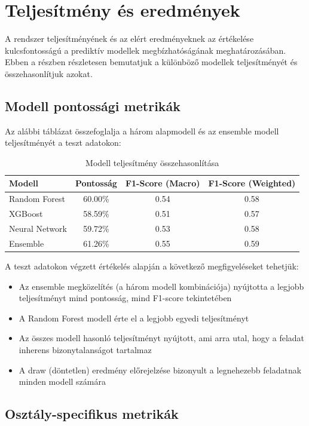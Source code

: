 \section{Teljesítmény és eredmények}

A rendszer teljesítményének és az elért eredményeknek az értékelése kulcsfontosságú a prediktív modellek megbízhatóságának meghatározásában. Ebben a részben részletesen bemutatjuk a különböző modellek teljesítményét és összehasonlítjuk azokat.

\subsection{Modell pontossági metrikák}

Az alábbi táblázat összefoglalja a három alapmodell és az ensemble modell teljesítményét a teszt adatokon:

\begin{table}[h]
\centering
\begin{tabular}{|l|c|c|c|}
\hline
\textbf{Modell} & \textbf{Pontosság} & \textbf{F1-Score (Macro)} & \textbf{F1-Score (Weighted)} \\
\hline
Random Forest & 60.00\% & 0.54 & 0.58 \\
XGBoost & 58.59\% & 0.51 & 0.57 \\
Neural Network & 59.72\% & 0.53 & 0.58 \\
Ensemble & 61.26\% & 0.55 & 0.59 \\
\hline
\end{tabular}
\caption{Modell teljesítmény összehasonlítása}
\label{tab:model-performance}
\end{table}

A teszt adatokon végzett értékelés alapján a következő megfigyeléseket tehetjük:
\begin{itemize}
    \item Az ensemble megközelítés (a három modell kombinációja) nyújtotta a legjobb teljesítményt mind pontosság, mind F1-score tekintetében
    \item A Random Forest modell érte el a legjobb egyedi teljesítményt
    \item Az összes modell hasonló teljesítményt nyújtott, ami arra utal, hogy a feladat inherens bizonytalanságot tartalmaz
    \item A draw (döntetlen) eredmény előrejelzése bizonyult a legnehezebb feladatnak minden modell számára
\end{itemize}

\subsection{Osztály-specifikus metrikák}

